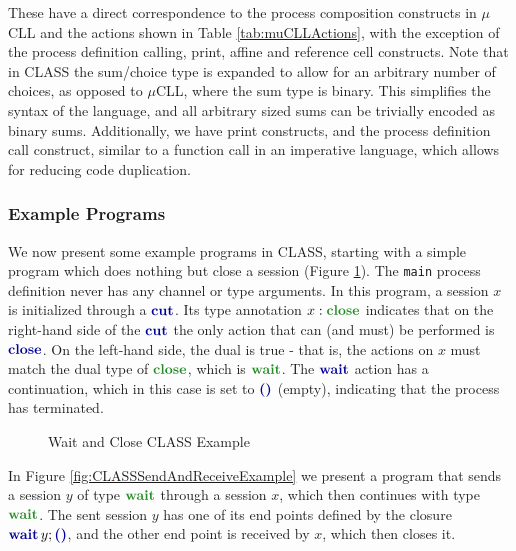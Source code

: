 These have a direct correspondence to the process composition constructs in $\mu$CLL and the actions shown in Table \ref{tab:muCLLActions}, with the exception of the process definition calling, print, affine and reference cell constructs. Note that in CLASS the sum/choice type is expanded to allow for an arbitrary number of choices, as opposed to $\mu$CLL, where the sum type is binary. This simplifies the syntax of the language, and all arbitrary sized sums can be trivially encoded as binary sums. Additionally, we have print constructs, and the process definition call construct, similar to a function call in an imperative language, which allows for reducing code duplication.

\subsubsection{Example Programs}

We now present some example programs in CLASS, starting with a simple program which does nothing but close a session (Figure \ref{fig:CLASSWaitCloseExample}). The \texttt{main} process definition never has any channel or type arguments. In this program, a session $x$ is initialized through a $\cutp$. Its type annotation $x: \closet$ indicates that on the right-hand side of the $\cutp$ the only action that can (and must) be performed is $\closep$. On the left-hand side, the dual is true - that is, the actions on $x$ must match the dual type of $\closet$, which is $\waitt$. The $\waitp$ action has a continuation, which in this case is set to $\emptyc$ (empty), indicating that the process has terminated.

\begin{figure}[H]
    \centering
    \begin{class}
    \end{class}
    \caption{Wait and Close CLASS Example}
    \label{fig:CLASSWaitCloseExample}
\end{figure}

In Figure \ref{fig:CLASSSendAndReceiveExample} we present a program that sends a session $y$ of type $\waitt$ through a session $x$, which then continues with type $\waitt$. The sent session $y$ has one of its end points defined by the closure $\waitc{y}{\emptyc}$, and the other end point is received by $x$, which then closes it.

